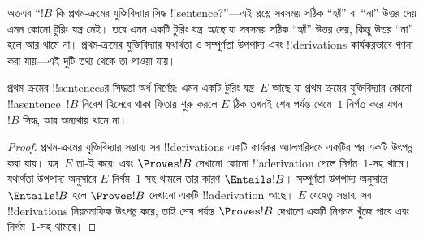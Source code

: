 \documentclass[../../../include/open-logic-section]{subfiles}
\begin{document}
\begin{explain}
অতএব “$!B$ কি প্রথম-ক্রমের যুক্তিবিদ্যার সিদ্ধ !!{sentence}?”—এই প্রশ্নে
সবসময় সঠিক “হ্যাঁ” বা “না” উত্তর দেয় এমন কোনো টুরিং যন্ত্র নেই। তবে
এমন একটি টুরিং যন্ত্র \emph{আছে} যা সবসময় সঠিক “হ্যাঁ” উত্তর দেয়, কিন্তু
উত্তর “না” হলে আর থামে না। প্রথম-ক্রমের যুক্তিবিদ্যার যথার্থতা ও
সম্পূর্ণতা উপপাদ্য এবং !!{derivation}s কার্যকরভাবে গণনা করা যায়—এই
দুটি তথ্য থেকে তা পাওয়া যায়।
\end{explain}

\begin{thm}
  প্রথম-ক্রমের !!{sentence}sর সিদ্ধতা অর্ধ-নির্ণেয়: এমন একটি টুরিং
  যন্ত্র~$E$ আছে যা প্রথম-ক্রমের যুক্তিবিদ্যার কোনো !!a{sentence}~$!B$
  নিবেশ হিসেবে থাকা ফিতায় শুরু করলে $E$ ঠিক তখনই শেষ পর্যন্ত থেমে~$1$
  নির্গত করে যখন $!B$ সিদ্ধ, আর অন্যথায় থামে না।
\end{thm}

\begin{proof}
  প্রথম-ক্রমের যুক্তিবিদ্যার সম্ভাব্য সব !!{derivation}s একটি কার্যকর
  অ্যালগরিদমে একটির পর একটি উৎপন্ন করা যায়। যন্ত্র~$E$ তা-ই করে; এবং
  $\Proves !B$ দেখানো কোনো !!a{derivation} পেলে নির্গম~$1$-সহ থামে।
  যথার্থতা উপপাদ্য অনুসারে $E$ নির্গম~$1$-সহ থামলে তার কারণ
  $\Entails !B$। সম্পূর্ণতা উপপাদ্য অনুসারে $\Entails !B$ হলে
  $\Proves !B$ দেখানো একটি !!a{derivation} আছে। $E$ যেহেতু সম্ভাব্য সব
  !!{derivation}s নিয়মমাফিক উৎপন্ন করে, তাই শেষ পর্যন্ত
  $\Proves !B$ দেখানো একটি নিগমন খুঁজে পাবে এবং নির্গম~$1$-সহ থামবে।
\end{proof}
\end{document}
